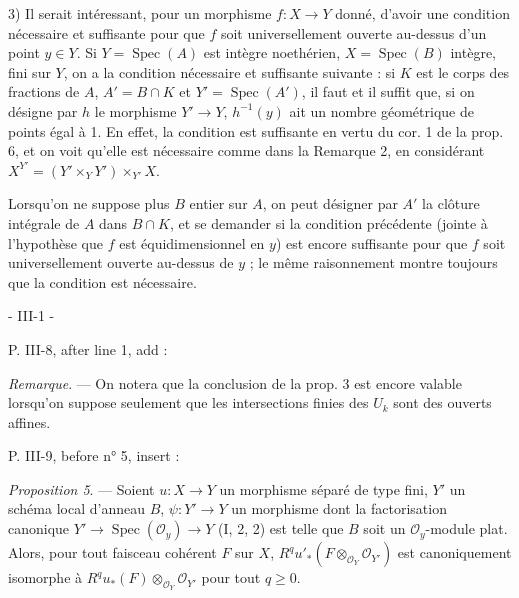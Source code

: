 3) Il serait intéressant, pour un morphisme $f: X \to Y$ donné, d'avoir une condition nécessaire et suffisante pour que $f$ soit universellement ouverte au-dessus d'un point $y \in Y$. Si $Y = \operatorname{Spec}(A)$ est intègre noethérien, $X = \operatorname{Spec}(B)$ intègre, fini sur $Y$, on a la condition nécessaire et suffisante suivante : si $K$ est le corps des fractions de $A$, $A' = B \cap K$ et $Y' = \operatorname{Spec}(A')$, il faut et il suffit que, si on désigne par $h$ le morphisme $Y' \to Y$, $h^{-1}(y)$ ait un nombre géométrique de points égal à 1. En effet, la condition est suffisante en vertu du cor. 1 de la prop. 6, et on voit qu'elle est nécessaire comme dans la Remarque 2, en considérant $X^{Y'} = (Y' \times_Y Y') \times_{Y'} X$.

Lorsqu'on ne suppose plus $B$ entier sur $A$, on peut désigner par $A'$ la clôture intégrale de $A$ dans $B \cap K$, et se demander si la condition précédente (jointe à l'hypothèse que $f$ est équidimensionnel en $y$) est encore suffisante pour que $f$ soit universellement ouverte au-dessus de $y$ ; le même raisonnement montre toujours que la condition est nécessaire.

\newpage



- III-1 -

P. III-8, after line 1, add :

\emph{Remarque}. — On notera que la conclusion de la prop. 3 est encore valable lorsqu'on suppose seulement que les intersections finies des $U_k$ sont des ouverts affines.

P. III-9, before n° 5, insert :

\emph{Proposition 5}. — Soient $u : X \to Y$ un morphisme séparé de type fini, $Y'$ un schéma local d'anneau $B$, $\psi : Y' \to Y$ un morphisme dont la factorisation canonique $Y' \to \operatorname{Spec}(\mathcal{O}_y) \to Y$ (I, 2, 2) est telle que $B$ soit un $\mathcal{O}_y$-module plat. Alors, pour tout faisceau cohérent $F$ sur $X$, $R^q u'_* (F \otimes_{\mathcal{O}_Y} \mathcal{O}_{Y'})$ est canoniquement isomorphe à $R^q u_*(F) \otimes_{\mathcal{O}_Y} \mathcal{O}_{Y'}$ pour tout $q \ge 0$.

